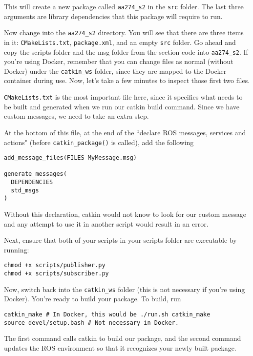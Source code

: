 This will create a new package called \texttt{aa274\_s2} in the \texttt{src} folder. The last three arguments are library dependencies that this package will require to run.

Now change into the \texttt{aa274\_s2} directory. You will see that there are three items in it: \texttt{CMakeLists.txt}, \texttt{package.xml}, and an empty \texttt{src} folder. Go ahead and copy the scripts folder and the msg folder from the section code into \texttt{aa274\_s2}. If you're using Docker, remember that you can change files as normal (without Docker) under the \texttt{catkin\_ws} folder, since they are mapped to the Docker container during use. Now, let's take a few minutes to inspect those first two files.

\texttt{CMakeLists.txt} is the most important file here, since it specifies what needs to be built and generated when we run our catkin build command. Since we have custom messages, we need to take an extra step.

At the bottom of this file, at the end of the ``declare ROS messages, services and actions" (before \texttt{catkin\_package()} is called), add the following

\begin{lstlisting}
add_message_files(FILES MyMessage.msg)

generate_messages(
  DEPENDENCIES
  std_msgs
)
\end{lstlisting}

Without this declaration, catkin would not know to look for our custom message and any attempt to use it in another script would result in an error.

Next, ensure that both of your scripts in your scripts folder are executable by running:

\begin{lstlisting}
chmod +x scripts/publisher.py
chmod +x scripts/subscriber.py
\end{lstlisting}

Now, switch back into the \texttt{catkin\_ws} folder (this is not necessary if you're using Docker). You're ready to build your package. To build, run

\begin{lstlisting}
catkin_make # In Docker, this would be ./run.sh catkin_make
source devel/setup.bash # Not necessary in Docker.
\end{lstlisting}

The first command calls catkin to build our package, and the second command updates the ROS environment so that it recognizes your newly built package.

